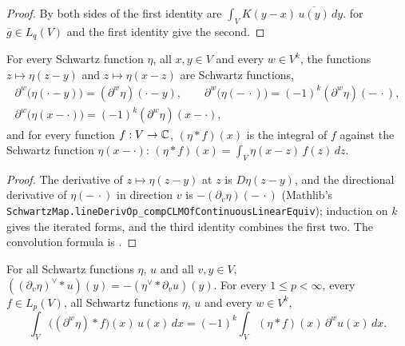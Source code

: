 \begin{proof}
\leanok
By  both sides of the first identity are
$\int_V K(y - x) \, \overline{u(y)} \, dy$.  for $\overline g \in
L_q(V)$ and the first identity give the second.
\end{proof}

\begin{lemma}
\label{lem:schwartz-shift-reflect}
\leanok
{}
For every Schwartz function $\eta$, all $x, y \in V$ and every $w \in V^k$, the functions
$z \mapsto \eta(z - y)$ and $z \mapsto \eta(x - z)$ are Schwartz functions,
\begin{gather*}
  \partial^w \bigl(\eta(\cdot - y)\bigr) = (\partial^w \eta)(\cdot - y), \qquad
  \partial^w \bigl(\eta(-\,\cdot)\bigr) = (-1)^k (\partial^w \eta)(-\,\cdot), \\
  \partial^w \bigl(\eta(x - \cdot)\bigr) = (-1)^k (\partial^w \eta)(x - \cdot),
\end{gather*}
and for every function $f : V \to \mathbb{C}$, $(\eta * f)(x)$ is the integral of $f$ against the
Schwartz function $\eta(x - \cdot)$:
$(\eta * f)(x) = \int_V \eta(x - z) \, f(z) \, dz$.
\end{lemma}

\begin{proof}
\leanok
The derivative of $z \mapsto \eta(z - y)$ at $z$ is $D\eta(z - y)$, and the directional
derivative of $\eta(-\,\cdot)$ in direction $v$ is $-(\partial_v \eta)(-\,\cdot)$ (Mathlib's
\texttt{SchwartzMap.\allowbreak lineDerivOp\_compCLMOfContinuousLinearEquiv}); induction on $k$
gives the iterated forms, and the third identity combines the first two. The convolution formula
is .
\end{proof}

\begin{lemma}
\label{lem:conv-derivative-transfer}
\leanok
{}
For all Schwartz functions $\eta$, $u$ and all $v, y \in V$,
$((\partial_v \eta)^\vee * u)(y) = -(\eta^\vee * \partial_v u)(y)$. For every
$1 \leq p < \infty$, every $f \in L_p(V)$, all Schwartz functions $\eta$, $u$ and every
$w \in V^k$,
\[
  \int_V \bigl((\partial^w \eta) * f\bigr)(x) \, u(x) \, dx
  = (-1)^k \int_V (\eta * f)(x) \, \partial^w u(x) \, dx .
\]
\end{lemma}

